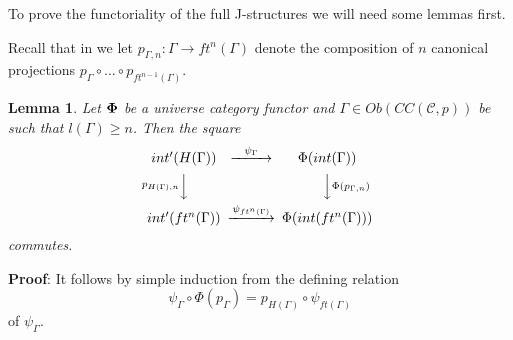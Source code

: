 \documentclass[12pt]{article}
\newenvironment{myproof}{{\bf Proof}:}{\vskip 5mm }
\newtheorem{lemma}[proposition]{Lemma}
\newcommand{\llabel}[1]{\label{#1}}
\newcommand{\sr}{\rightarrow}
\begin{document}
To prove the functoriality of the full J-structures we will need some lemmas first.

Recall that in \cite{Csubsystems} we let $p_{\Gamma,n}:\Gamma\sr ft^n(\Gamma)$ denote the composition of $n$ canonical projections $p_{\Gamma}\circ \dots\circ p_{ft^{n-1}(\Gamma)}$. 
%
\begin{lemma}
\llabel{2015.05.10.l1}
Let ${\bf\Phi}$ be a universe category functor and $\Gamma\in Ob(CC({\mathcal C},p))$ be such that $l(\Gamma)\ge n$. Then the square
%
$$
\begin{CD}
int'(H(\Gamma)) @>\psi_{\Gamma}>> \Phi(int(\Gamma))\\
@Vp_{H(\Gamma),n} VV @VV\Phi(p_{\Gamma,n})V\\
int'(ft^n(\Gamma)) @>\psi_{ft^n(\Gamma)}>> \Phi(int(ft^n(\Gamma)))
\end{CD}
$$
%
commutes.
\end{lemma}
%
\begin{myproof}
It follows by simple induction from the defining relation
%
$$\psi_{\Gamma}\circ \Phi(p_{\Gamma})=p_{H(\Gamma)}\circ \psi_{ft(\Gamma)}$$
%
of $\psi_{\Gamma}$. 
\end{myproof}
\end{document}

